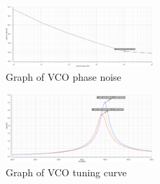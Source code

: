 \begin{figure}[h]
   \centering
    \includegraphics[width=0.5\textwidth]{figures/VCOPhaseNoise.png}
    \caption{Graph of VCO phase noise}
    \label{fig:vcophase}
\end{figure}

\begin{figure}[h]
   \centering
    \includegraphics[width=0.5\textwidth]{figures/VCOTuning.png}
    \caption{Graph of VCO tuning curve}
    \label{fig:vcotune}
\end{figure}